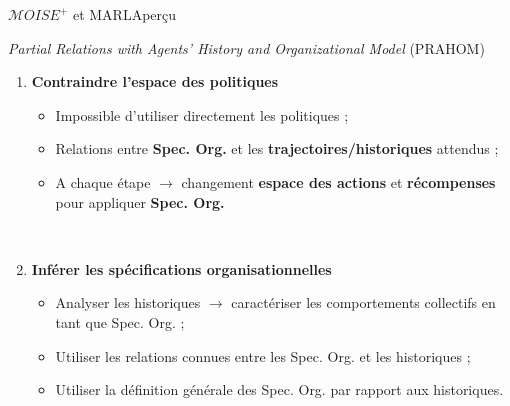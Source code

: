 \begin{frame}{$\mathcal{M}OISE^+$ et MARL}{Aperçu}


    \begin{block}{\emph{Partial Relations with Agents' History and Organizational Model} (PRAHOM)}
        \begin{enumerate}
            \item \textbf{Contraindre l'espace des politiques}
                  \begin{itemize}
                      \item Impossible d'utiliser directement les politiques ;
                      \item Relations entre \textbf{Spec. Org.} et les \textbf{trajectoires/historiques} attendus ;
                      \item A chaque étape $\rightarrow$ changement \textbf{espace des actions} et \textbf{récompenses} pour appliquer \textbf{Spec. Org.}
                  \end{itemize}

            \

            \item \textbf{Inférer les spécifications organisationnelles}
                  \begin{itemize}
                      \item Analyser les historiques $\rightarrow$ caractériser les comportements collectifs en tant que Spec. Org. ;
                      \item Utiliser les relations connues entre les Spec. Org. et les historiques ;
                      \item Utiliser la définition générale des Spec. Org. par rapport aux historiques.
                  \end{itemize}
        \end{enumerate}
    \end{block}
\end{frame}




